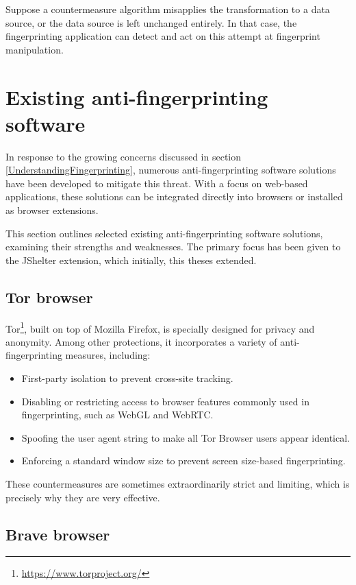 Suppose a countermeasure algorithm misapplies the transformation to a data source, or the data source is left unchanged entirely. In that case, the fingerprinting application can detect and act on this attempt at fingerprint manipulation.

\section{Existing anti-fingerprinting software}

In response to the growing concerns discussed in section \ref{UnderstandingFingerprinting}, numerous anti-fingerprinting software solutions have been developed to mitigate this threat. With a focus on web-based applications, these solutions can be integrated directly into browsers or installed as browser extensions.

This section outlines selected existing anti-fingerprinting software solutions, examining their strengths and weaknesses. The primary focus has been given to the JShelter extension, which initially, this theses extended.

\subsection{Tor browser}

Tor\footnote{\url{https://www.torproject.org/}}, built on top of Mozilla Firefox, is specially designed for privacy and anonymity. Among other protections, it incorporates a variety of anti-fingerprinting measures, including:

\begin{itemize}
	\item First-party isolation to prevent cross-site tracking.
	\item Disabling or restricting access to browser features commonly used in fingerprinting, such as WebGL and WebRTC.
	\item Spoofing the user agent string to make all Tor Browser users appear identical.
	\item Enforcing a standard window size to prevent screen size-based fingerprinting.
\end{itemize}

These countermeasures are sometimes extraordinarily strict and limiting, which is precisely why they are very effective.

\subsection{Brave browser}

